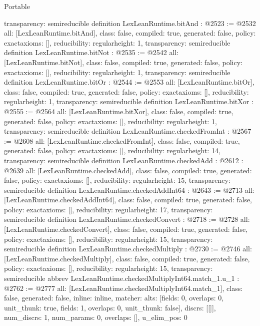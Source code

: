 \begin{lexlean}{Portable}
\begin{coremodule}
{  transparency: semireducible
}
definition LexLeanRuntime.bitAnd : @2523 := @2532 {
  all: [LexLeanRuntime.bitAnd],
  class: false,
  compiled: true,
  generated: false,
  policy: exact{axioms: []},
  reducibility: regular{height: 1},
  transparency: semireducible
}
definition LexLeanRuntime.bitNot : @2535 := @2542 {
  all: [LexLeanRuntime.bitNot],
  class: false,
  compiled: true,
  generated: false,
  policy: exact{axioms: []},
  reducibility: regular{height: 1},
  transparency: semireducible
}
definition LexLeanRuntime.bitOr : @2544 := @2553 {
  all: [LexLeanRuntime.bitOr],
  class: false,
  compiled: true,
  generated: false,
  policy: exact{axioms: []},
  reducibility: regular{height: 1},
  transparency: semireducible
}
definition LexLeanRuntime.bitXor : @2555 := @2564 {
  all: [LexLeanRuntime.bitXor],
  class: false,
  compiled: true,
  generated: false,
  policy: exact{axioms: []},
  reducibility: regular{height: 1},
  transparency: semireducible
}
definition LexLeanRuntime.checkedFromInt : @2567 := @2608 {
  all: [LexLeanRuntime.checkedFromInt],
  class: false,
  compiled: true,
  generated: false,
  policy: exact{axioms: []},
  reducibility: regular{height: 14},
  transparency: semireducible
}
definition LexLeanRuntime.checkedAdd : @2612 := @2639 {
  all: [LexLeanRuntime.checkedAdd],
  class: false,
  compiled: true,
  generated: false,
  policy: exact{axioms: []},
  reducibility: regular{height: 15},
  transparency: semireducible
}
definition LexLeanRuntime.checkedAddInt64 : @2643 := @2713 {
  all: [LexLeanRuntime.checkedAddInt64],
  class: false,
  compiled: true,
  generated: false,
  policy: exact{axioms: []},
  reducibility: regular{height: 17},
  transparency: semireducible
}
definition LexLeanRuntime.checkedConvert : @2718 := @2728 {
  all: [LexLeanRuntime.checkedConvert],
  class: false,
  compiled: true,
  generated: false,
  policy: exact{axioms: []},
  reducibility: regular{height: 15},
  transparency: semireducible
}
definition LexLeanRuntime.checkedMultiply : @2730 := @2746 {
  all: [LexLeanRuntime.checkedMultiply],
  class: false,
  compiled: true,
  generated: false,
  policy: exact{axioms: []},
  reducibility: regular{height: 15},
  transparency: semireducible
}
abbrev LexLeanRuntime.checkedMultiplyInt64.match_1.{u_1} : @2762 := @2777 {
  all: [LexLeanRuntime.checkedMultiplyInt64.match_1],
  class: false,
  generated: false,
  inline: inline,
  matcher: {
    alts: [{fields: 0, overlaps: 0, unit_thunk: true}, {fields: 1, overlaps: 0, unit_thunk: false}],
    discrs: [[]],
    num_discrs: 1,
    num_params: 0,
    overlaps: [],
    u_elim_pos: 0
}}
\end{coremodule}
\end{lexlean}
